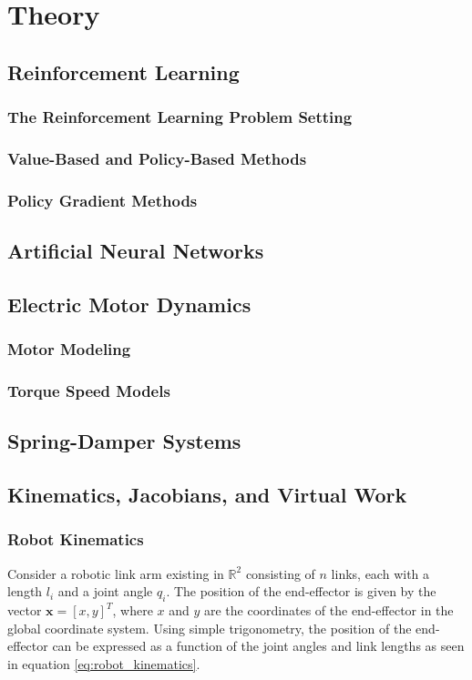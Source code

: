 \section{Theory}

\subsection{Reinforcement Learning}
    \subsubsection{The Reinforcement Learning Problem Setting}
    \subsubsection{Value-Based and Policy-Based Methods}
    \subsubsection{Policy Gradient Methods}

\subsection{Artificial Neural Networks}

\subsection{Electric Motor Dynamics}
    \subsubsection{Motor Modeling}
    \subsubsection{Torque Speed Models}

\subsection{Spring-Damper Systems}

\subsection{Kinematics, Jacobians, and Virtual Work}
    \subsubsection{Robot Kinematics}
    \label{sec:robot_kinematics}
Consider a robotic link arm existing in $\mathbb{R}^2$ consisting of $n$ links, each with a length $l_i$ and a joint angle $q_i$. The position of the end-effector is given by the vector $\mathbf{x} = [x, y]^T$, where $x$ and $y$ are the coordinates of the end-effector in the global coordinate system. Using simple trigonometry, the position of the end-effector can be expressed as a function of the joint angles and link lengths as seen in equation \ref{eq:robot_kinematics}.

